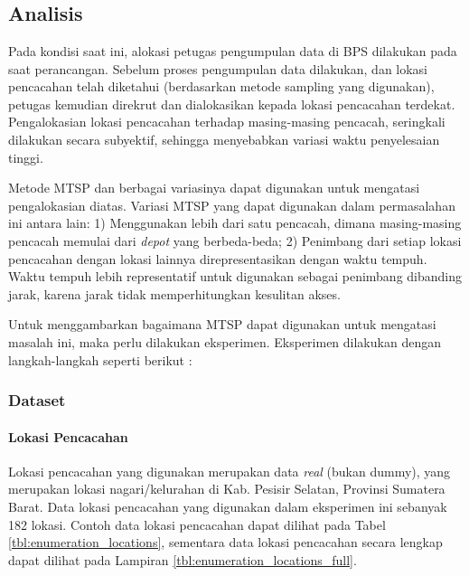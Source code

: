 \chapter{\babEmpat}


\section{Analisis}
\label{sec:analysis}
Pada kondisi saat ini, alokasi petugas pengumpulan data di BPS dilakukan pada saat perancangan. Sebelum proses pengumpulan data dilakukan, dan lokasi pencacahan telah diketahui (berdasarkan metode sampling yang digunakan), petugas kemudian direkrut dan dialokasikan kepada lokasi pencacahan terdekat. Pengalokasian lokasi pencacahan terhadap masing-masing pencacah, seringkali dilakukan secara subyektif, sehingga menyebabkan variasi waktu penyelesaian tinggi. 


Metode MTSP dan berbagai variasinya dapat digunakan untuk mengatasi pengalokasian diatas. Variasi MTSP yang dapat digunakan dalam permasalahan ini antara lain: 1) Menggunakan lebih dari satu pencacah, dimana masing-masing pencacah memulai dari \textit{depot} yang berbeda-beda; 2) Penimbang dari setiap lokasi pencacahan dengan lokasi lainnya direpresentasikan dengan waktu tempuh. Waktu tempuh lebih representatif untuk digunakan sebagai penimbang dibanding jarak, karena jarak tidak memperhitungkan kesulitan akses. 


Untuk menggambarkan bagaimana MTSP dapat digunakan untuk mengatasi masalah ini, maka perlu dilakukan eksperimen. Eksperimen dilakukan dengan langkah-langkah seperti berikut :


\subsection{Dataset}
\label{ssec:mtsp_dataset}
\subsubsection{Lokasi Pencacahan}
Lokasi pencacahan yang digunakan merupakan data \textit{real} (bukan dummy), yang merupakan lokasi nagari/kelurahan di Kab. Pesisir Selatan, Provinsi Sumatera Barat. Data lokasi pencacahan yang digunakan dalam eksperimen ini sebanyak 182 lokasi. Contoh data lokasi pencacahan dapat dilihat pada Tabel \ref{tbl:enumeration_locations}, sementara data lokasi pencacahan secara lengkap dapat dilihat pada Lampiran \ref{tbl:enumeration_locations_full}.


